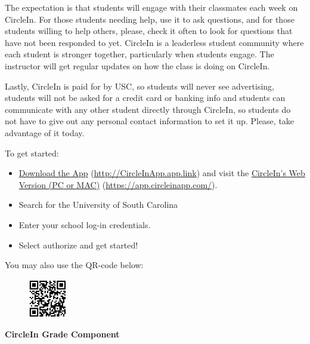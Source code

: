 \documentclass[11pt,letterpaper]{article}
\begin{document}
The expectation is that students will engage with their classmates each week on CircleIn. For those students needing help, use it to ask questions, and for those students willing to help others, please, check it often to look for questions that have not been responded to yet. CircleIn is a leaderless student community where each student is stronger together, particularly when students engage. The instructor will get regular updates on how the class is doing on CircleIn. \pspace

Lastly, CircleIn is paid for by USC, so students will never see advertising, students will not be asked for a credit card or banking info and students can communicate with any other student directly through CircleIn, so students do not have to give out any personal contact information to set it up. Please, take advantage of it today. \pspace

To get started:
	\begin{itemize}
	\item \href{http://CircleInApp.app.link}{Download the App} (\url{http://CircleInApp.app.link}) and visit the \href{https://app.circleinapp.com/}{CircleIn's Web Version (PC or MAC)} (\url{https://app.circleinapp.com/}).
	\item Search for the University of South Carolina
	\item Enter your school log-in credentials. 
	\item Select authorize and get started! 
	\end{itemize}
You may also use the QR-code below:
	\begin{figure}[!ht]
	\centering
	\includegraphics[width=0.15\textwidth]{circlein_qr.png}
	\end{figure} \pspace

{\bfseries CircleIn Grade Component} \par
\end{document}
